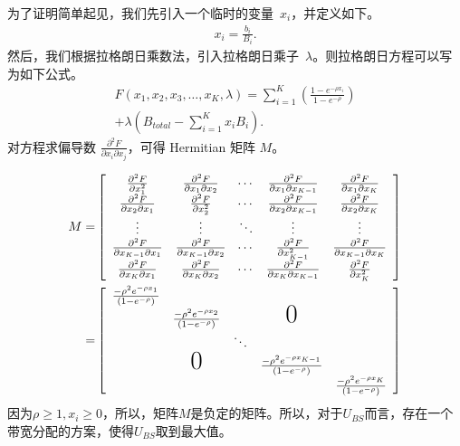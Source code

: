 \proof
为了证明简单起见，我们先引入一个临时的变量~$x_i$，并定义如下。
\begin{equation*}
\begin{split}
x_i = \frac{b_i}{B_i}.
\end{split}
\end{equation*}
%
然后，我们根据拉格朗日乘数法，引入拉格朗日乘子~$\lambda$。则拉格朗日方程可以写为如下公式。
\begin{equation}
\begin{split}
F (x_1, x_2, x_3, \dots, x_K, \lambda) = \sum^K_{i=1}
\left( \frac{1-e^{-\rho x_i}}{1-e^{-\rho}} \right) \\+ \lambda
\left(B_{total} - \sum^K_{i=1} x_i B_i \right).
\end{split}
\end{equation}
对方程求偏导数 $\frac{\partial ^2F}{\partial x_i \partial x_j}$，可得 Hermitian 矩阵 $M$。

\begin{eqnarray*}
{M} = & 
\left[
\begin{array}{ccccc}
\frac{\partial ^2F}{\partial x_1 ^2} &\frac{\partial ^2F}{\partial x_1 \partial x_2} & \dotsi & \frac{\partial ^2F}{\partial x_1 \partial x_{K-1}}& \frac{\partial ^2F}{\partial x_1 \partial x_K} \\
\frac{\partial ^2F}{\partial x_2 \partial x_1}& \frac{\partial ^2F}{\partial x_2 ^2}& \dotsi & \frac{\partial ^2F}{\partial x_2 \partial x_{K-1}}&\frac{\partial ^2F}{\partial x_2 \partial x_K}\\
\vdots & \vdots & \ddots & \vdots & \vdots \\
\frac{\partial ^2F}{\partial x_{K-1} \partial x_1 } &\frac{\partial ^2F}{\partial x_{K-1} \partial x_2}&\dotsi &\frac{\partial ^2F}{\partial x_{K-1}^2}&\frac{\partial ^2F}{\partial x_{K-1} \partial x_K}\\
\frac{\partial ^2F}{\partial x_{K} \partial x_1 } &\frac{\partial ^2F}{\partial x_{K} \partial x_2} & \dotsi & \frac{\partial ^2F}{\partial x_{K} \partial x_{K-1}}&\frac{\partial ^2F}{\partial x_K ^2}\\
\end{array}
\right] \\
=&
\left[
\begin{array}{ccccc}
\frac{-\rho^2 e^{-\rho x_1}}{(1-e^{-\rho})} \\
&\frac{-\rho^2 e^{-\rho x_2}}{(1-e^{-\rho})} & & \text{{\huge{0}}}\\
& &\ddots\\
& \text{{\huge{0}}} & & \frac{-\rho^2 e^{-\rho x_{K-1}}}{(1-e^{-\rho})}\\
& & & &\frac{-\rho^2 e^{-\rho x_K}}{(1-e^{-\rho})}
\end{array}
\right] 
\end{eqnarray*}
因为$\rho \ge 1, x_i \ge 0$，所以，矩阵$M$是负定的矩阵。所以，对于$U_{BS}$而言，存在一个带宽分配的方案，使得$U_{BS}$取到最大值。

